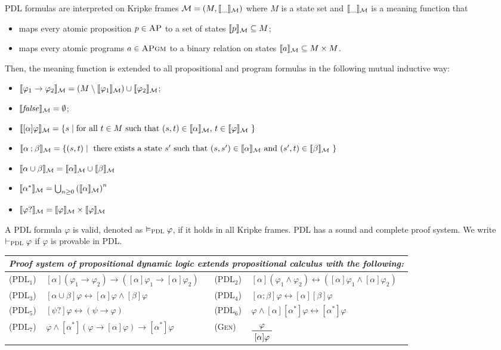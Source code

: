 \documentclass[acmsmall,review,anonymous]{acmart}
\newcommand{\imp}{\to}
\newcommand{\dimp}{\leftrightarrow}
\newcommand{\MM}{\mathcal{M}}
\newcommand{\prule}[1]{\textsc{(#1)}}
\newcommand{\AP}{\textsc{AP}}
\newcommand{\APgm}{\textsc{APgm}}
\newcommand{\false}{\mathit{false}}
\DeclarePairedDelimiter{\bracket}{\llbracket}{\rrbracket}
\newcommand{\bracketM}[1]{{\bracket{#1}_\MM}}
\newcommand{\PDL}{\textsc{PDL}}
\newcommand{\PDLseq}{\mathbin{;}}
\newcommand{\PDLunion}{\mathbin{\cup}}
\newcommand{\PDLstar}{^*}
\newcommand{\PDLquestion}{{?}}
\begin{document}
PDL formulas are interpreted on Kripke frames
$\MM = (M,\bracketM{\_})$ where $M$ is a state set and 
$\bracketM{\_}$ is a meaning function that
\begin{itemize}
\item maps every atomic proposition $p \in \AP$ to a set of states $\bracketM{p} \subseteq M$;
\item maps every atomic programs $a \in \APgm$ to a binary relation on states
      $\bracketM{a} \subseteq M \times M$.
\end{itemize}
Then, the meaning function is extended to all propositional and program formulas
in the following mutual inductive way:
\begin{itemize}
\item $\bracketM{\varphi_1 \imp \varphi_2} = 
       (M \setminus \bracketM{\varphi_1}) \cup \bracketM{\varphi_2}$;
\item $\bracketM{\false} = \emptyset$;
\item $\bracketM{[\alpha] \varphi}
       = \{ s \mid \text{for all $t \in M$ such that $(s,t) \in \bracketM{\alpha}$,
                         $t \in \bracketM{\varphi}$ } \}$
\item $\bracketM{\alpha \PDLseq \beta} =
       \{ (s,t) \mid \text{
       there exists a state $s'$ such that
       $(s,s') \in \bracketM{\alpha}$ and $(s',t) \in \bracketM{\beta}$
        } \}$
\item $\bracketM{\alpha \PDLunion \beta} =
       \bracketM{\alpha} \cup \bracketM{\beta}$
\item $\bracketM{\alpha \PDLstar} =
       \bigcup_{n \ge 0} \left(\bracketM{\alpha}\right)^n$
\item $\bracketM{\varphi\PDLquestion} = \bracketM{\varphi} \times \bracketM{\varphi}$
\end{itemize}
A PDL formula $\varphi$ is valid, denoted as $\vDash_\PDL \varphi$,
if it holds in all Kripke frames.
PDL has a sound and complete proof system.
We write $\vdash_\PDL \varphi$ if $\varphi$ is provable in PDL.
\begin{center}
\begin{tabular}{lm{5cm}lm{5cm}}
\multicolumn{4}{l}{
\em
Proof system of propositional dynamic logic extends propositional calculus with
the following:
}
\\\hline
\prule{PDL$_1$} &
$[\alpha] (\varphi_1 \imp \varphi_2) \imp ([\alpha] \varphi_1 \imp [\alpha] \varphi_2)$
&
\prule{PDL$_2$} &
$[\alpha] (\varphi_1 \wedge \varphi_2) \dimp ([\alpha] \varphi_1 \wedge [\alpha] \varphi_2)$
\\
\prule{PDL$_3$} &
$[\alpha \PDLunion \beta] \varphi \dimp [\alpha] \varphi \wedge [\beta] \varphi$
&
\prule{PDL$_4$} &
$[\alpha \PDLseq \beta] \varphi \dimp [\alpha][\beta]\varphi$
\\
\prule{PDL$_5$} &
$[\psi \PDLquestion] \varphi \dimp (\psi \imp \varphi)$
&
\prule{PDL$_6$} &
$\varphi \wedge [\alpha][\alpha \PDLstar]\varphi \dimp [\alpha \PDLstar]\varphi$
\\
\prule{PDL$_7$} &
$\varphi \wedge [\alpha\PDLstar](\varphi \imp [\alpha]\varphi) \imp [\alpha \PDLstar] \varphi$
&
\prule{Gen} &
$\prftree{\varphi}{[\alpha]\varphi}$
\end{tabular}
\end{center}
\end{document}
